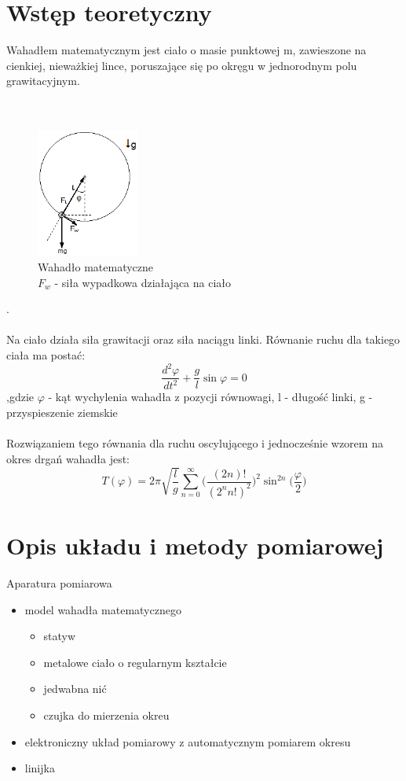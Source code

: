 \documentclass[a4paper,10pt]{article}
\begin{document}
\section{Wstęp teoretyczny}
Wahadłem matematycznym jest ciało o masie punktowej m, zawieszone na cienkiej, nieważkiej lince, poruszające się po okręgu w jednorodnym polu grawitacyjnym.
\\
\\
\\
\begin{figure}[H]
\centering
\includegraphics[width=0.3\textwidth]{wahadlo.png}
\caption{Wahadło matematyczne \\$F_w$ - siła wypadkowa działająca na ciało}
\end{figure}.
\\
\\Na ciało działa siła grawitacji oraz siła naciągu linki. Równanie ruchu dla takiego ciała ma postać:
\begin{equation}
\frac{d^2\varphi}{dt^2} + \frac{g}{l}\sin\varphi = 0
\end{equation}
,gdzie $\varphi$ - kąt wychylenia wahadła z pozycji równowagi, l - długość linki, g - przyspieszenie ziemskie
\\
\\Rozwiązaniem tego równania dla ruchu oscylującego i jednocześnie wzorem na okres drgań wahadła jest:
\begin{equation}
T(\varphi) = 2\pi\sqrt{\frac{l}{g}}\sum_{n=0}^{\infty}\bigg(\frac{(2n)!}{(2^nn!)^2}\bigg)^2\sin^{2n}\bigg(\frac{\varphi}{2}\bigg)
\end{equation}

\section{Opis układu i metody pomiarowej}
Aparatura pomiarowa
\begin{itemize}
  \item model wahadła matematycznego
\begin{itemize}
  \item statyw
  \item metalowe ciało o regularnym kształcie
  \item jedwabna nić
  \item czujka do mierzenia okreu
\end{itemize}
  \item elektroniczny układ pomiarowy z automatycznym pomiarem okresu
  \item linijka
\end{itemize}
 
\end{document}
